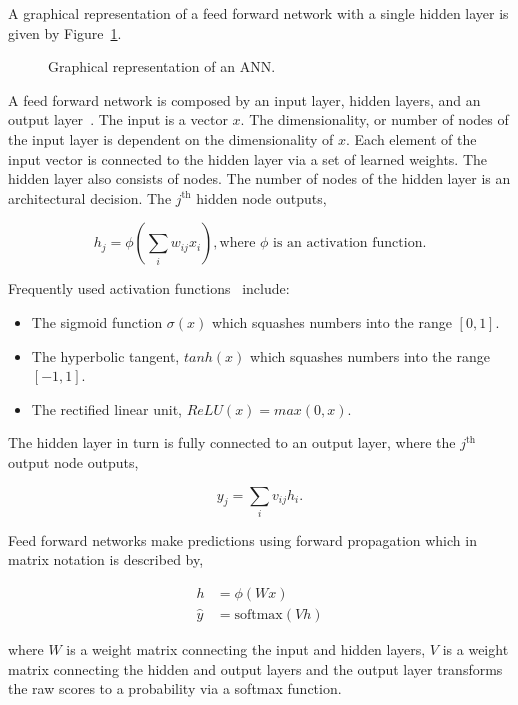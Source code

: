 A graphical representation of a feed forward network with a single hidden layer
is given by Figure~\ref{fig:ann}.

\begin{figure}[!htbp]
    \centering
    
    \caption{Graphical representation of an ANN.}\label{fig:ann}
\end{figure}

A feed forward network is composed by an input layer, hidden layers, and an
output layer~\cite{Jain1996, Krose1993}. The input is a vector \(x\). The dimensionality, or
number of nodes of the input layer is dependent on the dimensionality of \(x\).
Each element of the input vector is connected to the hidden layer via a set of
learned weights. The hidden layer also consists of nodes. The number of
nodes of the hidden layer is an architectural decision. The \(j^{\text{th}}\)
hidden node outputs,

\[h_j = \phi (\sum_{i} w_{ij} x_{i}), \text{where } \phi  \text{ is an activation function}.\]

Frequently used activation functions~\cite{Karlik2011, Krose1993} include:

\begin{itemize}
    \item The sigmoid function \(\sigma(x)\) which squashes numbers into the range \([0, 1]\).
    \item The hyperbolic tangent, \(tanh(x)\) which squashes numbers into the range \([-1, 1]\).
    \item The rectified linear unit, \(ReLU(x)=max(0,x)\).
\end{itemize}

The hidden layer in turn is fully connected to an output layer, where the
\(j^{\text{th}}\) output node outputs,

\[y_{j} = \sum_{i} v_{ij} h_{i}.\]

Feed forward networks make predictions using forward propagation which in matrix
notation is described by,

\begin{align}\label{eq:neural_network_equations}
h & = \phi(Wx) \\ \label{eq:neural_network_equations_two}
\hat{y} & = \text{softmax}(Vh)
\end{align}

where \(W\) is a weight matrix connecting the input and hidden layers, \(V\) is
a weight matrix connecting the hidden and output layers and the output layer
transforms the raw scores to a probability via a softmax function.

